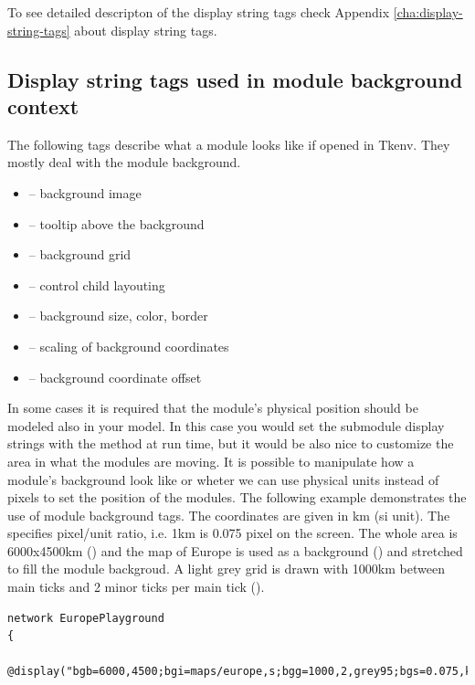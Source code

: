 To see detailed descripton of the display string tags check
Appendix \ref{cha:display-string-tags} about display string tags.

\subsection{Display string tags used in module background context}

The following tags describe what a module looks like if opened in
Tkenv. They mostly deal with the module background.

\begin{itemize}
  \item {} -- background image
  \item {} -- tooltip above the background
  \item {} -- background grid
  \item {} -- control child layouting
  \item {} -- background size, color, border
  \item {} -- scaling of background coordinates
  \item {} -- background coordinate offset
\end{itemize}

In some cases it is required that the module's physical position should be modeled
also in your model. In this case you would set the submodule display strings with 
the  method at run time, but it would be also nice to
customize the area in what the modules are moving. It is possible to manipulate
how a module's background look like or wheter we can use physical units instead
of pixels to set the position of the modules. The following example demonstrates the use 
of module background tags. The coordinates are given in km (si unit). 
The  specifies pixel/unit ratio, i.e. 1km is 0.075 pixel on the screen.
The whole area is 6000x4500km () and the map of Europe is used as a 
background () and stretched to fill the module backgroud.
A light grey grid is drawn with 1000km between main ticks and 2 minor ticks per main tick
(). 

\begin{verbatim}
network EuropePlayground
{
    @display("bgb=6000,4500;bgi=maps/europe,s;bgg=1000,2,grey95;bgs=0.075,km");
\end{verbatim}

